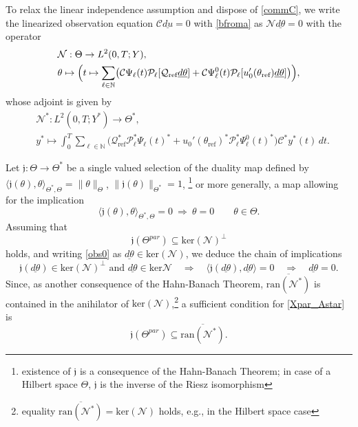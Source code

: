 \documentclass[12pt]{article}
\newcommand\uld[1]{\underline{d#1}}
\newcommand\Op{\mathcal{N}}
\newcommand\Proj{\mathcal{P}}
\newcommand\dualmap{\mathfrak{j}}
\newcommand\hrefprime{\mathcal{Q}_{\text{ref}}}
\begin{document}
To relax the linear independence assumption and dispose of \eqref{commC}, we write the linearized observation equation $\mathcal{C}\uld{u}=0$ with \eqref{bfroma} as $\Op\uld{\theta}=0$ with the operator 
\[
\begin{aligned}
&\Op:\Theta\to L^2(0,T;Y), \quad \\ &
\theta\mapsto \Bigl(t\mapsto
\sum_{\ell\in\mathbb{N}}
\bigl(\mathcal{C}\Psi_\ell(t) \Proj_\ell[\hrefprime\uld{\theta}] + \mathcal{C}\Psi_\ell^0(t)\Proj_\ell[u_0'(\theta_{\text{ref}})\uld{\theta}]\bigr)
\Bigr),
\end{aligned}
\]
whose adjoint is given by
\[
\begin{aligned}
&\Op^*:L^2(0,T;Y^*)\to\Theta^*, \quad \\ &
y^*\mapsto \int_0^T
\sum_{\ell\in\mathbb{N}}
\bigl(\hrefprime^*\Proj_\ell^*\Psi_\ell(t)^*
+u_0'(\theta_{\text{ref}})^*\Proj_\ell^*\Psi_\ell^0(t)^*
\bigr)\mathcal{C}^*y^*(t)\, dt.
\end{aligned}
\]

Let $\dualmap:\Theta\to\Theta^*$ be a single valued selection of the duality map defined by $\langle\dualmap(\theta),\theta\rangle_{\Theta^*,\Theta}=\|\theta\|_\Theta$, $\|\dualmap(\theta)\|_{\Theta^*}=1$, \footnote{existence of $\dualmap$ is a consequence of the Hahn-Banach Theorem; in case of a Hilbert space $\Theta$, $\dualmap$ is the inverse of the Riesz isomorphism} or more generally, a map allowing for the implication 
\begin{equation}\label{dualmap}
\langle \dualmap(\theta),\theta\rangle_{\Theta^*,\Theta} =0 \ \Rightarrow \ \theta=0 \qquad \theta\in\Theta.
\end{equation}
Assuming that
\begin{equation}\label{Xpar_Astar}
\dualmap(\Theta^{par})\subseteq \text{ker}(\Op)^\bot
\end{equation}
holds, and writing \eqref{obs0} as $\uld{\theta}\in\text{ker}(\Op)$, we deduce the chain of implications 
\[
\dualmap(\uld{\theta})\in \text{ker}(\Op)^\bot\text{ and }\uld{\theta}\in\text{ker}{\Op} 
\quad \Rightarrow \quad  
\langle \dualmap(\uld{\theta}),\uld{\theta}\rangle =0 \quad \Rightarrow \quad \uld{\theta}=0.
\]
Since, as another consequence of the Hahn-Banach Theorem, $\overline{\text{ran}(\Op^*)}$ 
is contained in the anihilator of $\text{ker}(\Op)$,\footnote{equality $\overline{\text{ran}(\Op^*)}=\text{ker}(\Op)$ holds, e.g., in the Hilbert space case} a sufficient condition for \eqref{Xpar_Astar} is  
\begin{equation}\label{Xpar_Astar_ran}
\dualmap(\Theta^{par})\subseteq \overline{\text{ran}(\Op^*)}.
\end{equation}
\end{document}
